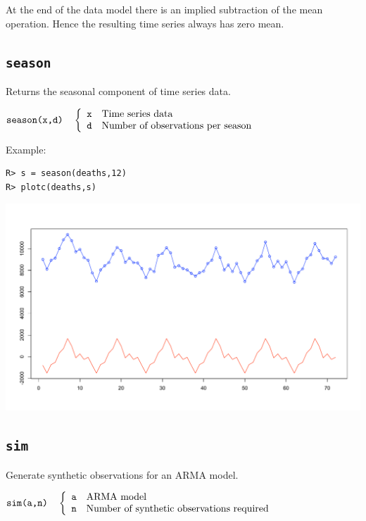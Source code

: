 \documentclass[11pt]{article}
\begin{document}
\noindent
At the end of the data model there
is an implied subtraction of the mean operation.
Hence the resulting time series always has zero mean.

\newpage

\subsection{\tt season}
Returns the seasonal component of time series data.

\bigskip
$
\hbox{\tt season(x,d)}\quad\left\{\begin{array}{ll}
{\tt x} & \hbox{Time series data}\\
{\tt d} & \hbox{Number of observations per season}
\end{array}\right.
$

\bigskip
\noindent
Example:

\begin{verbatim}
R> s = season(deaths,12)
R> plotc(deaths,s)
\end{verbatim}

\begin{center}
\includegraphics[scale=0.3]{Rplot-1.pdf}
\end{center}

\newpage

\subsection{\tt sim}
Generate synthetic observations for an ARMA model.

\bigskip
$
\hbox{\tt sim(a,n)}\quad\left\{\begin{array}{ll}
{\tt a} & \hbox{ARMA model}\\
{\tt n} & \hbox{Number of synthetic observations required}
\end{array}\right.
$
\end{document}
